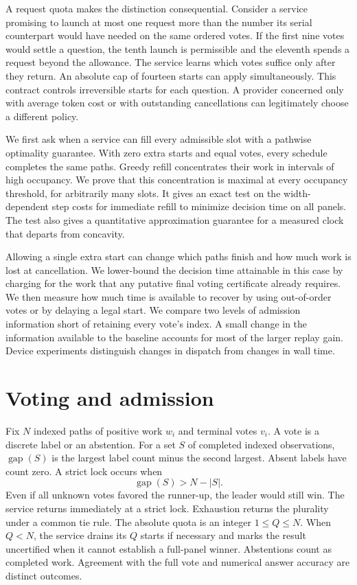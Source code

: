 \documentclass{article}
\newcommand{\gap}{\operatorname{gap}}
\begin{document}
A request quota makes the distinction consequential. Consider a service promising to launch at most one request more than the number its serial counterpart would have needed on the same ordered votes. If the first nine votes would settle a question, the tenth launch is permissible and the eleventh spends a request beyond the allowance. The service learns which votes suffice only after they return. An absolute cap of fourteen starts can apply simultaneously. This contract controls irreversible starts for each question. A provider concerned only with average token cost or with outstanding cancellations can legitimately choose a different policy.

We first ask when a service can fill every admissible slot with a pathwise optimality guarantee. With zero extra starts and equal votes, every schedule completes the same paths. Greedy refill concentrates their work in intervals of high occupancy. We prove that this concentration is maximal at every occupancy threshold, for arbitrarily many slots. It gives an exact test on the width-dependent step costs for immediate refill to minimize decision time on all panels. The test also gives a quantitative approximation guarantee for a measured clock that departs from concavity.

Allowing a single extra start can change which paths finish and how much work is lost at cancellation. We lower-bound the decision time attainable in this case by charging for the work that any putative final voting certificate already requires. We then measure how much time is available to recover by using out-of-order votes or by delaying a legal start. We compare two levels of admission information short of retaining every vote's index. A small change in the information available to the baseline accounts for most of the larger replay gain. Device experiments distinguish changes in dispatch from changes in wall time.

\section{Voting and admission}\label{sec:front}
Fix \(N\) indexed paths of positive work \(w_i\) and terminal votes \(v_i\). A vote is a discrete label or an abstention. For a set \(S\) of completed indexed observations, \(\gap(S)\) is the largest label count minus the second largest. Absent labels have count zero. A strict lock occurs when
\[
                       \gap(S)>N-|S|.
\]
Even if all unknown votes favored the runner-up, the leader would still win. The service returns immediately at a strict lock. Exhaustion returns the plurality under a common tie rule. The absolute quota is an integer \(1\le Q\le N\). When \(Q<N\), the service drains its \(Q\) starts if necessary and marks the result uncertified when it cannot establish a full-panel winner. Abstentions count as completed work. Agreement with the full vote and numerical answer accuracy are distinct outcomes.
\end{document}
